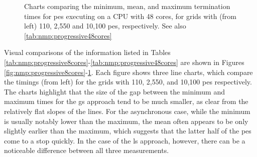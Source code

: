 \begin{figure}
    \centering
    \caption[Charts comparing the minimum, mean, and maximum termination times for \acrshort{pe}s on a 48-core CPU]{Charts comparing the minimum, mean, and maximum termination times for \glspl{pe} executing on a CPU with 48 cores, for grids with (from left) 110, 2,550 and 10,100 \glspl{pe}, respectively.  See also \cref{tab:nmp:progressive48cores}}
    \label{fig:nmp:progressivecharts48cores}
\end{figure}

Visual comparisons of the information listed in Tables \ref{tab:nmp:progressive8cores}-\ref{tab:nmp:progressive48cores} are shown in Figures \ref{fig:nmp:progressive8cores}-\ref{fig:nmp:progressivecharts48cores}.  Each figure shows three line charts, which compare the timings (from left) for the grids with 110, 2,550, and 10,100 \glspl{pe} respectively.  The charts highlight that the size of the gap between the minimum and maximum times for the \gls{gs} approach tend to be much smaller, as clear from the relatively flat slopes of the lines.  For the asynchronous case, while the minimum is usually notably lower than the maximum, the mean often appears to be only slightly earlier than the maximum, which suggests that the latter half of the \glspl{pe} come to a stop quickly.  In the case of the \gls{ls} approach, however, there can be a noticeable difference between all three measurements.

